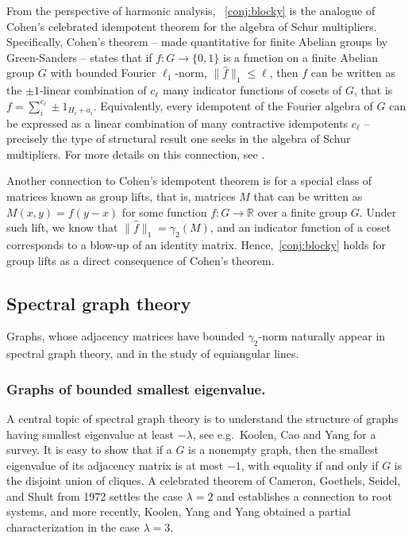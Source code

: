 \documentclass[11pt]{amsart}
\theoremstyle{plain}
\theoremstyle{definition}
\begin{document}
 From the perspective of harmonic analysis, ~\cref{conj:blocky} is the analogue of Cohen's celebrated idempotent theorem for the algebra of Schur multipliers. Specifically, Cohen's theorem -- made quantitative for finite Abelian groups by Green-Sanders \cite{green2008boolean, green2008quantitative} -- states that if $f : G \to \{0,1\}$ is a function on a finite Abelian group $G$ with bounded Fourier $\ell_1$-norm, $\|\hat{f}\|_1 \leq \ell$, then $f$ can be written as the $\pm 1$-linear combination of $c_{\ell}$ many indicator functions of cosets of $G$, that is $f = \sum_{i}^{c_{\ell}} \pm 1_{H_{i} + a_i}$. Equivalently, every idempotent of the Fourier algebra of $G$ can be
expressed as a linear combination of  many contractive idempotents $c_{\ell}$ -- precisely the type of structural result one seeks in the algebra of Schur multipliers. For more details on this connection, see \cite{HHH}.

 
  Another connection to Cohen's idempotent theorem is for a special class of matrices known as group lifts, that is, matrices $M$ that can be written as $M(x,y) = f(y - x)$ for some function $f : G \to \mathbb{R}$ over a finite group $G$. Under such lift, we know that $\|\hat{f}\|_1 = \gamma_2(M)$, and an indicator function of a coset corresponds to a blow-up of an identity matrix. Hence,~\cref{conj:blocky} holds for group lifts as a direct consequence of Cohen's theorem.

\subsection{Spectral graph theory} Graphs, whose adjacency matrices have bounded $\gamma_2$-norm naturally appear in spectral graph theory, and in the study of equiangular lines.

\subsubsection{Graphs of bounded smallest eigenvalue.} A central topic of spectral graph theory is to understand the structure of graphs having smallest eigenvalue at least $-\lambda$, see e.g.\ Koolen, Cao and Yang \cite{KCQ} for a survey. It is easy to show that if a $G$ is a nonempty graph, then the smallest eigenvalue of its adjacency matrix is at most $-1$, with equality if and only if $G$ is the disjoint union of cliques. A celebrated theorem of Cameron, Goethels, Seidel, and Shult \cite{CGSS} from 1972 settles the case $\lambda = 2$ and establishes a connection to root systems, and more recently, Koolen, Yang and Yang \cite{KYY} obtained a partial characterization in the case $\lambda = 3$. 
\end{document}
